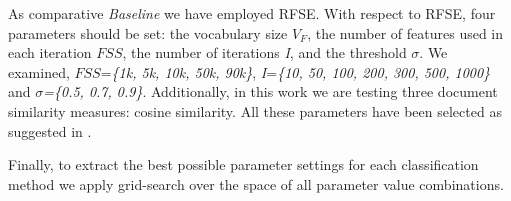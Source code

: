 \documentclass[runningheads]{llncs}
\begin{document}
%
%

As comparative \textit{Baseline} we have employed RFSE. With respect to RFSE, four parameters should be set: the vocabulary size $V_{F}$, the number of features used in each iteration $FSS$, the number of iterations \textit{I}, and the threshold $\sigma$. We examined, $FSS$=\textit{\{1k, 5k, 10k, 50k, 90k\}}, \textit{I}=\textit{\{10, 50, 100, 200, 300, 500, 1000\}} and $\sigma$\textit{=\{0.5, 0.7, 0.9\}}. Additionally, in this work we are testing three document similarity measures: cosine similarity. All these parameters have been selected as suggested in \cite{pritsos2018open}.

Finally, to extract the best possible parameter settings for each classification method we apply grid-search over the space of all parameter value combinations.
\end{document}
